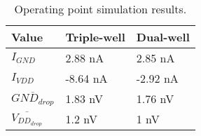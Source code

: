 
\begin{table}[H]
	\centering
	\begin{tabularx}{\columnwidth}{XXX}
		Value  & Triple-well & Dual-well \\ \hline
		$I_{GND}$                                  & 2.88 nA       & 2.85 nA      \\
		$I_{VDD}$                                  & -8.64 nA       & -2.92 nA       \\
		$\overline{GND_{drop}}$           & 1.83 nV       & 1.76 nV      \\
		$\overline{V_{DD_{drop}}}$     & 1.2 nV          & 1 nV
	\end{tabularx}
	\caption{Operating point simulation results.}
	\label{tab_op}
\end{table}
